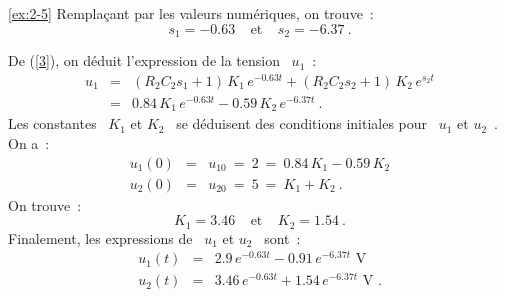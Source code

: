 \begin{solexercise}{\ref{ex:2-5}}
Rempla\c{c}ant par les valeurs num\'eriques, on trouve~:
\[ s_1 = -0.63~~~~~\mbox{et}~~~~~s_2 = -6.37~.\]

De (\ref{3}), on d\'eduit l'expression de la tension \ $u_1$~:
\begin{eqnarray*}
	u_1 &=& (R_2C_2s_1+1) \, K_1\, e^{-0.63t} + (R_2C_2s_2+1) \, K_2 \, e^{s_2t} \\
	&=& 0.84\, K_1 \, e^{-0.63t} - 0.59\, K_2\, e^{-6.37t}~. 
\end{eqnarray*}
Les constantes \ $K_1$ et $K_2$ \ se d\'eduisent des conditions initiales pour \ $u_1$ et $u_2$~.
On a~:
\begin{eqnarray*}
	u_1(0) &=& u_{10} \: = \: 2 \: = \: 0.84\, K_1 - 0.59\, K_2\\
	u_2(0) &=& u_{20} \: = \: 5 \: = \: K_1 + K_2~.
\end{eqnarray*}
On trouve~:
\[ K_1 = 3.46 ~~~~~\mbox{et}~~~~~K_2 = 1.54~. \]
Finalement, les expressions de \ $u_1$ et $u_2$ \ sont~:
\begin{eqnarray*}
	u_1(t) &=& 2.9\, e^{-0.63t} - 0.91 \, e^{-6.37t}\mbox{~V}\\
	u_2(t) &=& 3.46\, e^{-0.63t} + 1.54 \, e^{-6.37t}\mbox{~V~.}
\end{eqnarray*}
\end{solexercise}

